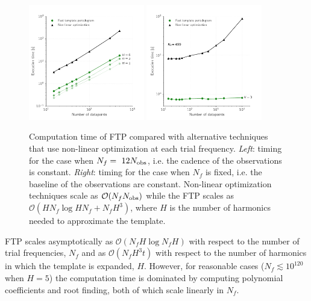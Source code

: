 \documentclass[apj]{emulateapj}
\newcommand{\bigO}{\mathcal{O}}
\begin{document}
\begin{figure}
    \centering
    \includegraphics[width=0.45\textwidth]{plots/timing_vs_ndata.pdf}
    \includegraphics[width=0.45\textwidth]{plots/timing_vs_ndata_const_freq.pdf}
    \caption{\label{fig:timingndata} Computation time of FTP compared with alternative techniques
             that use non-linear optimization at each trial frequency. \emph{Left}: timing for the
             case when $N_f = ~12 N_{\rm obs}$, i.e. the cadence of the observations is constant. 
             \emph{Right}: timing for the case when $N_f$ is fixed, i.e. the baseline of the observations
             are constant. Non-linear optimization techniques scale as $\bigO(N_f N_{\rm obs})$ while 
             the FTP scales as $\bigO(HN_f\log HN_f + N_fH^3)$, where $H$ is the number of harmonics
             needed to approximate the template.}
    
\end{figure}

FTP scales asymptotically as $\bigO(N_fH\log N_fH)$ with respect to the number of trial frequencies,
$N_f$ and as $\bigO(N_fH^3t)$ with respect to the number of harmonics in which the template is expanded, $H$.
However, for reasonable cases ($N_f \lesssim 10^{120}$ when $H=5$) the computation time is dominated by
computing polynomial coefficients and root finding, both of which scale linearly in $N_f$. 
\end{document}
